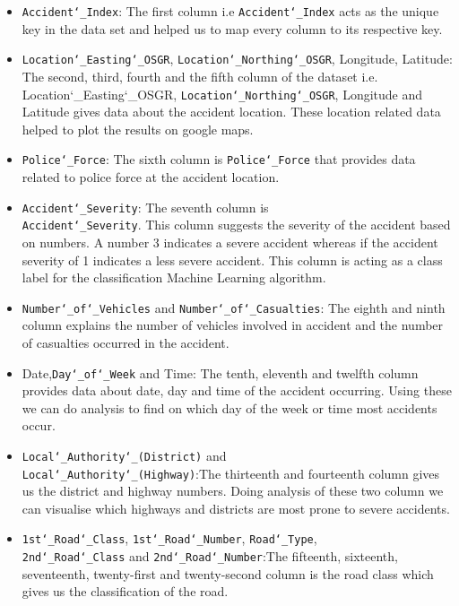 \documentclass{acm_proc_article-sp}
\begin{document}
\begin{itemize}
    \item \texttt{Accident\char`_Index}: The first column i.e \texttt{Accident\char`_Index} acts as the unique key in the data set and helped us to map every column to its respective key. 
    \item \texttt{Location\char`_Easting\char`_OSGR}, \texttt{Location\char`_Northing\char`_OSGR}, Longitude, Latitude: The second, third, fourth and the fifth column of the dataset i.e.  Location\char`_Easting\char`_OSGR,  \texttt{Location\char`_Northing\char`_OSGR}, Longitude and Latitude gives data about the accident location. These location related data helped to plot the results on google maps.
    \item \texttt{Police\char`_Force}: The sixth column is \texttt{Police\char`_Force} that provides data related to police force at the accident location.
    \item \texttt{Accident\char`_Severity}: The seventh column is    \\ \texttt{Accident\char`_Severity}. This column suggests the severity of the accident based on numbers. A number 3 indicates a severe accident  whereas if the accident severity of 1 indicates a less severe accident. This column is acting as a class label for the classification Machine Learning algorithm.
    \item \texttt{Number\char`_of\char`_Vehicles} and \texttt{Number\char`_of\char`_Casualties}: The eighth and ninth column explains the number of vehicles involved in accident and the number of casualties occurred in the accident.
    \item Date,\texttt{Day\char`_of\char`_Week} and Time: The tenth, eleventh and twelfth column provides data about date, day and time of the accident occurring. Using these we can do analysis to find on which day of the week or time most accidents occur. 
    \item \texttt{Local\char`_Authority\char`_(District)} and \\ \texttt{Local\char`_Authority\char`_(Highway)}:The thirteenth and fourteenth column gives us the district and highway numbers. Doing analysis of these two column we can visualise which highways and districts are most prone to severe accidents. 
    \item \texttt{1st\char`_Road\char`_Class},  \texttt{1st\char`_Road\char`_Number},  \texttt{Road\char`_Type}, \\ \texttt{2nd\char`_Road\char`_Class} and  \texttt{2nd\char`_Road\char`_Number}:The fifteenth, sixteenth, seventeenth, twenty-first and twenty-second column is the road class which gives us the classification of the road.

\end{itemize}
\end{document}
